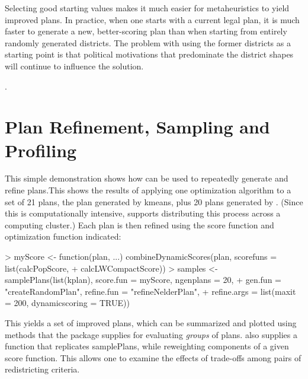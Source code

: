 \documentclass[article]{JSSstyle/jss}
\begin{document}
Selecting good starting values makes it much easier for metaheuristics to yield improved plans.  
In practice, when one starts with a current legal plan, it is much faster to generate a new, better-scoring plan 
than when starting from entirely randomly generated districts.  The problem with using the former districts as a starting point is that 
political motivations that predominate the district shapes will continue to influence the solution.  


. 

\section{Plan Refinement, Sampling and Profiling}

This simple demonstration shows how  can be used to repeatedly generate and refine plans.This shows the results of applying one optimization algorithm to a set of 21 plans, the plan generated by kmeans, plus 20 plans generated by . (Since this is computationally intensive,  supports distributing this process across a computing cluster.) Each plan is then refined using the score function and optimization function indicated:

\begin{Schunk}
\begin{Sinput}
> myScore <- function(plan, ...) combineDynamicScores(plan, scorefuns = list(calcPopScore, 
+     calcLWCompactScore))
> samples <- samplePlans(list(kplan), score.fun = myScore, ngenplans = 20, 
+     gen.fun = "createRandomPlan", refine.fun = "refineNelderPlan", 
+     refine.args = list(maxit = 200, dynamicscoring = TRUE))
\end{Sinput}
\end{Schunk}

This yields a set of improved plans, which can be summarized and plotted using methods that the package supplies for evaluating \emph{groups} of plans.  also supplies a  function that replicates samplePlans, while reweighting components of a given score function. This allows one to examine the effects of trade-offs among pairs of redistricting criteria. 
\end{document}
